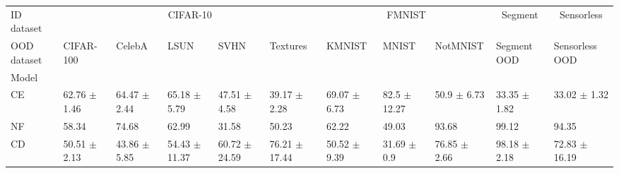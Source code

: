 \begin{tabular}{lllllllllll}
\toprule
ID dataset & \multicolumn{5}{c}{CIFAR-10} & \multicolumn{3}{c}{FMNIST} &                                     \multicolumn{1}{c}{Segment} &                                   \multicolumn{1}{c}{Sensorless} \\
\cmidrule(l){2-6} \cmidrule(l){7-9} \cmidrule(l){10-10} \cmidrule(l){11-11} 
OOD dataset &                                   CIFAR-100 &                                       CelebA &                                        LSUN &                                         SVHN &                                    Textures &                                       KMNIST &                                        MNIST &                                     NotMNIST &                                 Segment OOD &                               Sensorless OOD \\
Model  &                                             &                                              &                                             &                                              &                                             &                                              &                                              &                                              &                                             &                                              \\
\midrule
CE     &            62.76 {\footnotesize $\pm$ 1.46} &             64.47 {\footnotesize $\pm$ 2.44} &            65.18 {\footnotesize $\pm$ 5.79} &             47.51 {\footnotesize $\pm$ 4.58} &            39.17 {\footnotesize $\pm$ 2.28} &             69.07 {\footnotesize $\pm$ 6.73} &             82.5 {\footnotesize $\pm$ 12.27} &              50.9 {\footnotesize $\pm$ 6.73} &            33.35 {\footnotesize $\pm$ 1.82} &             33.02 {\footnotesize $\pm$ 1.32} \\
NF     &                                      58.34  &                                       74.68  &                                      62.99  &                                       31.58  &                                      50.23  &                                       62.22  &                                       49.03  &                                       93.68  &                                      99.12  &                                       94.35  \\
\midrule
CD   &            50.51 {\footnotesize $\pm$ 2.13} &             43.86 {\footnotesize $\pm$ 5.85} &           54.43 {\footnotesize $\pm$ 11.37} &            60.72 {\footnotesize $\pm$ 24.59} &           76.21 {\footnotesize $\pm$ 17.44} &             50.52 {\footnotesize $\pm$ 9.39} &              31.69 {\footnotesize $\pm$ 0.9} &             76.85 {\footnotesize $\pm$ 2.66} &            98.18 {\footnotesize $\pm$ 2.18} &            72.83 {\footnotesize $\pm$ 16.19} \\

\end{tabular}
